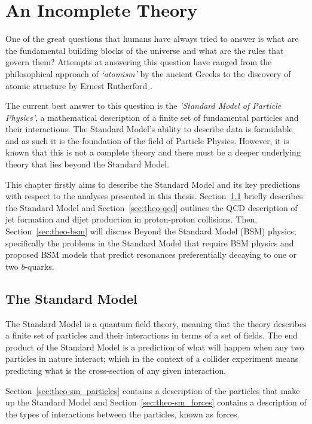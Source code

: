 \chapter{An Incomplete Theory}
\label{sec:theo}

One of the great questions that humans have always tried to answer is
what are the fundamental building blocks of the universe and what are the rules that govern them?
Attempts at answering this question have ranged from the
philosophical approach of \textit{`atomism'} by the ancient Greeks \cite{theo-atomism}
to the discovery of atomic structure by Ernest Rutherford \cite{theo-rutherford}.

The current best answer to this question is the \textit{`Standard Model of Particle Physics'},
a mathematical description of a finite set of fundamental particles and their interactions.
The Standard Model's ability to describe data is formidable
and as such it is the foundation of the field of Particle Physics. 
However, it is known that this is not a complete theory and there must be
a deeper underlying theory that lies beyond the Standard Model.

This chapter firstly aims to describe the Standard Model and its key predictions
with respect to the analyses presented in this thesis.
Section~\ref{sec:theo-sm} briefly describes the Standard Model and
Section~\ref{sec:theo-qcd} outlines the QCD description of jet formation and dijet production in proton-proton collisions.
Then, Section~\ref{sec:theo-bsm} will discuss Beyond the Standard Model (BSM) physics;
specifically the problems in the Standard Model that require BSM physics
and proposed BSM models that predict resonances preferentially decaying to one or two $b$-quarks.

\newpage
\section{The Standard Model}
\label{sec:theo-sm}

The Standard Model is a quantum field theory,
meaning that the theory describes a finite set of particles and their interactions in
terms of a set of fields.
The end product of the Standard Model is a prediction
of what will happen when any two particles in nature interact;
which in the context of a collider experiment means predicting what is the cross-section of any given interaction.

Section~\ref{sec:theo-sm_particles} contains a description of the particles that make up the Standard Model 
and Section~\ref{sec:theo-sm_forces} contains a description of the types of interactions between the particles, known as forces.

